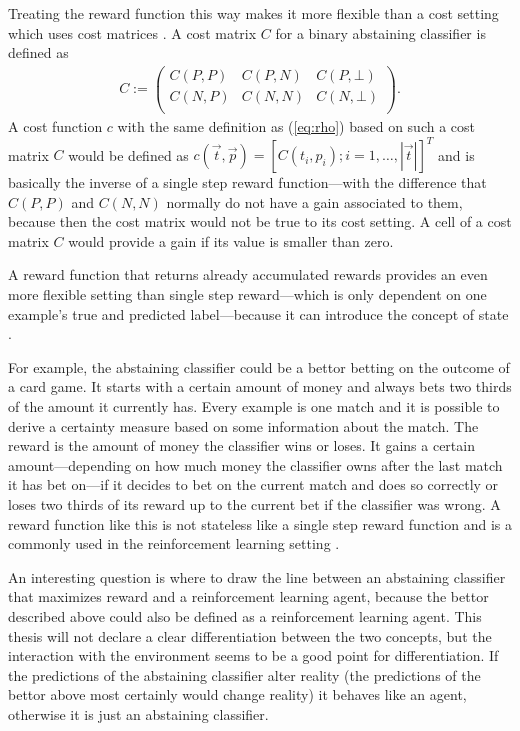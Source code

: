 \documentclass[twoside,11pt]{article}
\begin{document}
Treating the reward function this way makes it more
flexible than a cost setting which uses cost matrices
\citep[see][]{fisher_et_al_2016}. A cost matrix $C$ for a
binary abstaining classifier is defined as
\begin{align*}
  C :=
    \begin{pmatrix}
      C(P, P) &C(P, N) &C(P, \bot) \\
      C(N, P) &C(N, N) &C(N, \bot) \\
    \end{pmatrix}.
\end{align*}
A cost function $c$ with the same definition as
(\ref{eq:rho}) based on such a cost matrix $C$ would be
defined as $c(\vec{t}, \vec{p}) = [C(t_i, p_i);
i=1,\dots,|\vec{t}|]^T$ and is basically the inverse of a
single step reward function---with the difference that
$C(P, P)$ and $C(N, N)$ normally do not have a gain
associated to them, because then the cost matrix would not
be true to its cost setting.
A cell of a cost matrix $C$ would provide a gain if its
value is smaller than zero.

A reward function that returns already accumulated rewards
provides an even more flexible setting than single step
reward---which is only dependent on one example's true and
predicted label---because it can introduce the concept of
state \citep[see][Chapter 1]{sutton_et_al_2018}.

For example, the abstaining classifier could be a bettor
betting on the outcome of a card game.
It starts with a certain amount of money and always bets
two thirds of the amount it currently has.
Every example is one match and it is possible to derive a
certainty measure based on some information about the
match.
The reward is the amount of money the classifier wins or
loses.
It gains a certain amount---depending on how much money the
classifier owns after the last match it has bet on---if
it decides to bet on the current match and does so
correctly or loses two thirds of its reward up to the
current bet if the classifier was wrong.
A reward function like this is not stateless like a
single step reward function and is a commonly used
in the reinforcement learning setting
\citep[see][Chapter 1]{sutton_et_al_2018}.

An interesting question is where to draw the line between
an abstaining classifier that maximizes reward and a
reinforcement learning agent, because the bettor described
above could also be defined as a reinforcement learning
agent.
This thesis will not declare a clear differentiation
between the two concepts, but the interaction with the
environment seems to be a good point for differentiation.
If the predictions of the abstaining classifier alter
reality (the predictions of the bettor above most certainly
would change reality) it behaves like an agent, otherwise
it is just an abstaining classifier.
\end{document}
